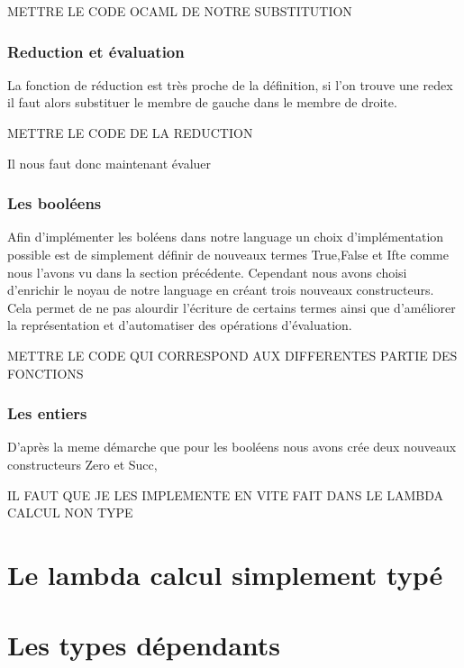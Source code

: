 \documentclass {article}
\theoremstyle{definition}
\theoremstyle{remark}
\begin{document}
METTRE LE CODE OCAML DE NOTRE SUBSTITUTION


\subsubsection{Reduction et évaluation}
La fonction de réduction est très proche de la définition, si l'on trouve
une redex il faut alors substituer le membre de gauche dans le membre de 
droite. 

METTRE LE CODE DE LA REDUCTION

Il nous faut donc maintenant évaluer 
 


\subsubsection{Les booléens}
Afin d'implémenter les boléens dans notre language un choix d'implémentation 
possible est de simplement définir de nouveaux termes True,False et Ifte
comme nous l'avons vu dans la section précédente. Cependant nous avons choisi 
d'enrichir le noyau de notre language en créant trois nouveaux constructeurs.
Cela permet de ne pas alourdir l'écriture de certains termes ainsi que 
d'améliorer la représentation et d'automatiser des opérations d'évaluation.

METTRE LE CODE QUI CORRESPOND AUX DIFFERENTES PARTIE DES FONCTIONS 


\subsubsection{Les entiers}

D'après la meme démarche que pour les booléens nous avons crée deux nouveaux 
constructeurs Zero et Succ, 

IL FAUT QUE JE LES IMPLEMENTE EN VITE FAIT DANS LE LAMBDA CALCUL NON TYPE

\section{Le lambda calcul simplement typé}

\section{Les types dépendants}




\end{document}
